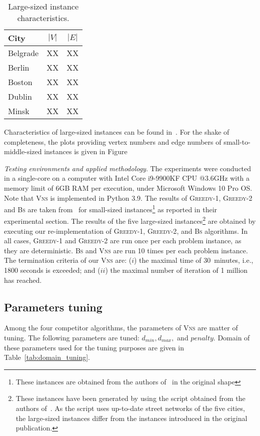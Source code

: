 \documentclass[sigconf]{acmart}
\begin{document}
 \begin{table}
 	\begin{tabular}{lcc}
 		\textbf{City}      & $|V|$ & $|E|$ \\ \hline
 		Belgrade  & XX    &   XX  \\ 
 		Berlin        & XX    &   XX \\
 	    Boston        & XX    &   XX \\
 	    Dublin        & XX    &   XX \\
 	    Minsk        & XX    &   XX \\ \hline
 	\end{tabular}
     \caption{Large-sized instance characteristics.}
          \label{tab:big_instances_chars}  
 \end{table}
 
 Characteristics of large-sized instances can be found in~\cite{corcoran2021heuristics}. For the shake of completeness, the plots providing vertex numbers and edge numbers of small-to-middle-sized instances is given in Figure  
 
 \emph{Testing environments and applied methodology}. The experiments were conducted in a single-core on a computer with Intel Core i9-9900KF CPU @3.6GHz with a memory limit of 6GB RAM per execution, under Microsoft Windows 10 Pro OS. Note that \textsc{Vns}  is implemented in Python 3.9. The results of \textsc{Greedy-1}, \textsc{Greedy-2} and \textsc{Bs} are taken from~\cite{corcoran2021heuristics} for small-sized instances\footnote{These instances are obtained from the authors of~\cite{corcoran2021heuristics} in the original shape} as reported in their experimental section. The results of the  five large-sized instances\footnote{These instances have been generated by using the script obtained from the authors of~\cite{corcoran2021heuristics}. As the script uses up-to-date street networks of the five cities, the large-sized instances differ from the instances introduced in the original publication. } are obtained by executing our re-implementation of \textsc{Greedy-1}, \textsc{Greedy-2}, and \textsc{Bs} algorithms. In all cases, \textsc{Greedy-1} and \textsc{Greedy-2} are run once per each problem instance, as they are deterministic. \textsc{Bs} and \textsc{Vns} are run 10 times per each problem instance.  The termination criteria of our \textsc{Vns} are: ($i$) the maximal time of 30~minutes, i.e., 1800 seconds is exceeded; and ($ii$) the maximal number of iteration of 1 million has reached. 
\subsection{Parameters tuning}
   Among the four competitor algorithms, the parameters of \textsc{Vns} are matter of tuning. The following parameters are tuned: $d_{min}, d_{max},$ and  $penalty$. Domain of these parameters used for the tuning purposes are given in Table~\ref{tab:domain_tuning}.
   
\end{document}
